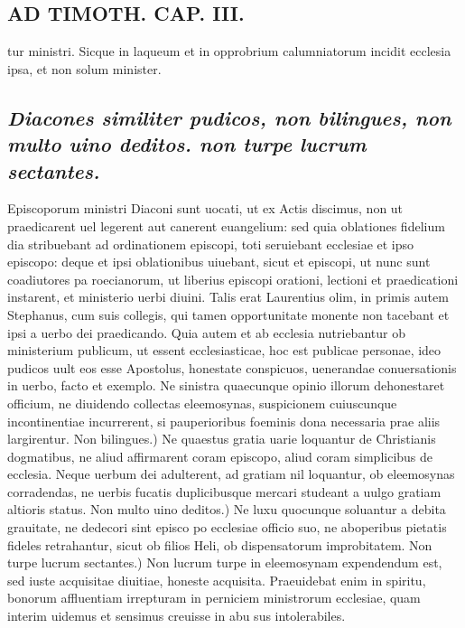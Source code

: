 \documentclass{article}
\begin{document}
\begin{pages}
\section*{AD TIMOTH. CAP. III. }
\marginpar{[ p.499 ]}\pstart tur ministri. Sicque in laqueum et in opprobrium calumniatorum incidit ecclesia ipsa, et non solum minister.  \pend
{}
{}
\subsection*{\textit{Diacones similiter pudicos, non bilingues, non multo uino deditos. non turpe lucrum sectantes. }}\pstart Episcoporum ministri Diaconi sunt uocati, ut ex Actis discimus, non ut praedicarent uel legerent aut canerent euangelium: sed quia oblationes fidelium dia stribuebant ad ordinationem episcopi, toti seruiebant ecclesiae et ipso episcopo: deque et ipsi oblationibus uiuebant, sicut et episcopi, ut nunc sunt coadiutores pa roecianorum, ut liberius episcopi orationi, lectioni et praedicationi instarent, et ministerio uerbi diuini. Talis erat Laurentius olim, in primis autem Stephanus, cum suis collegis, qui tamen opportunitate monente non tacebant et ipsi a uerbo dei praedicando. Quia autem et ab ecclesia nutriebantur ob ministerium publicum, ut essent ecclesiasticae, hoc est publicae personae, ideo pudicos uult eos esse Apostolus, honestate conspicuos, uenerandae conuersationis in uerbo, facto et exemplo. Ne sinistra quaecunque opinio illorum dehonestaret officium, ne diuidendo collectas eleemosynas, suspicionem cuiuscunque incontinentiae incurrerent, si pauperioribus foeminis dona necessaria prae aliis largirentur. Non bilingues.) Ne quaestus gratia uarie loquantur de Christianis dogmatibus, ne aliud affirmarent coram episcopo, aliud coram simplicibus de ecclesia. Neque uerbum dei adulterent, ad gratiam nil loquantur, ob eleemosynas corradendas, ne uerbis fucatis duplicibusque mercari studeant a uulgo gratiam altioris status. Non multo uino deditos.) Ne luxu quocunque soluantur a debita grauitate, ne dedecori sint episco po ecclesiae officio suo, ne aboperibus pietatis fideles retrahantur, sicut ob filios Heli, ob dispensatorum improbitatem. Non turpe lucrum sectantes.) Non lucrum turpe in eleemosynam expendendum est, sed iuste acquisitae diuitiae, honeste acquisita. Praeuidebat enim in spiritu, bonorum affluentiam irrepturam in perniciem ministrorum ecclesiae, quam interim uidemus et sensimus creuisse in abu sus intolerabiles.  \pend
{}
{}

\end{pages}
\end{document}
